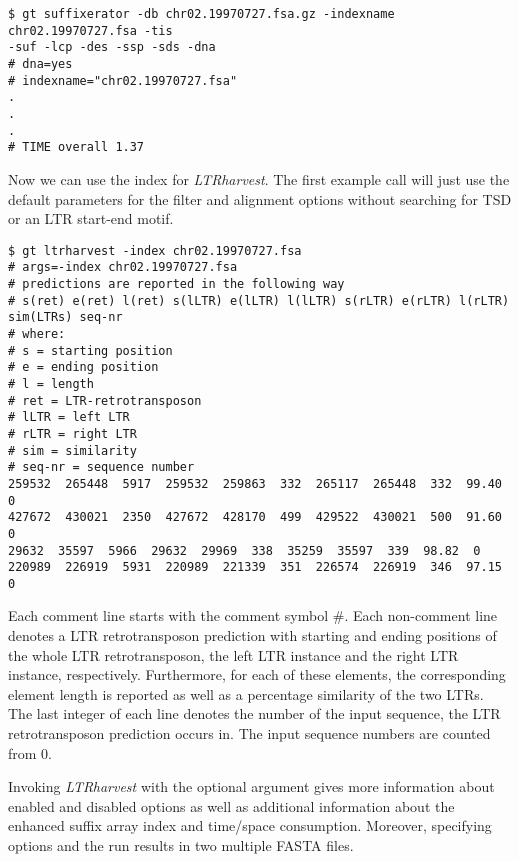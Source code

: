 \documentclass[12pt,titlepage]{article}
\newcommand{\LTRharvest}{\textit{LTRharvest}\xspace}
\begin{document}
\begin{footnotesize}
\begin{verbatim}
$ gt suffixerator -db chr02.19970727.fsa.gz -indexname chr02.19970727.fsa -tis
-suf -lcp -des -ssp -sds -dna
# dna=yes
# indexname="chr02.19970727.fsa"
.
.
.
# TIME overall 1.37
\end{verbatim}
\end{footnotesize}

Now we can use the index for \LTRharvest. The first example call will just use
the default parameters for the filter and alignment options
without searching for TSD or an LTR start-end motif.

\begin{footnotesize}
\begin{verbatim}
$ gt ltrharvest -index chr02.19970727.fsa
# args=-index chr02.19970727.fsa
# predictions are reported in the following way
# s(ret) e(ret) l(ret) s(lLTR) e(lLTR) l(lLTR) s(rLTR) e(rLTR) l(rLTR)
sim(LTRs) seq-nr
# where:
# s = starting position
# e = ending position
# l = length
# ret = LTR-retrotransposon
# lLTR = left LTR
# rLTR = right LTR
# sim = similarity
# seq-nr = sequence number
259532  265448  5917  259532  259863  332  265117  265448  332  99.40  0
427672  430021  2350  427672  428170  499  429522  430021  500  91.60  0
29632  35597  5966  29632  29969  338  35259  35597  339  98.82  0
220989  226919  5931  220989  221339  351  226574  226919  346  97.15  0
\end{verbatim}
\end{footnotesize}

Each comment line starts with the comment symbol \#.
Each non-comment line denotes a LTR retrotransposon prediction with
starting and ending positions of the whole LTR retrotransposon, the
left LTR instance and the right LTR instance, respectively. Furthermore,
for each of these elements, the corresponding element length is reported
as well as a percentage similarity of the two LTRs. The last integer of
each line denotes the number of the input sequence, the LTR retrotransposon
prediction occurs in. The input sequence numbers are counted from 0.

Invoking \LTRharvest with the optional argument  gives
more information about enabled and disabled options as well as
additional information about the enhanced suffix array index
and time/space consumption. Moreover, specifying options 
and  the run results in two multiple FASTA files.
\end{document}
